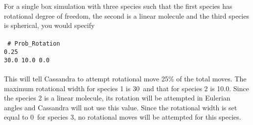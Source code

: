 For a single box simulation with three species such that the first species has rotational degree of freedom, the second is a linear molecule and the third species is spherical, you would specify \\ \\
%
\texttt{
{\# Prob\_Rotation} \\
 0.25 \\
30.0 10.0 0.0}
\\ \\
This will tell Cassandra to attempt rotational move 25\% of the total moves. 
The maximum rotational width for species 1 is 30\degree\ and that for species 2
 is 10.0\degree. Since the species 2 is a linear molecule, its rotation will
 be attempted in Eulerian angles and Cassandra will not use this value. 
Since the rotational width is set equal to 0\degree\ for species 3, no rotational moves will be attempted for this species. 
%
%
%
%
%
%
%
%
%
%
%
